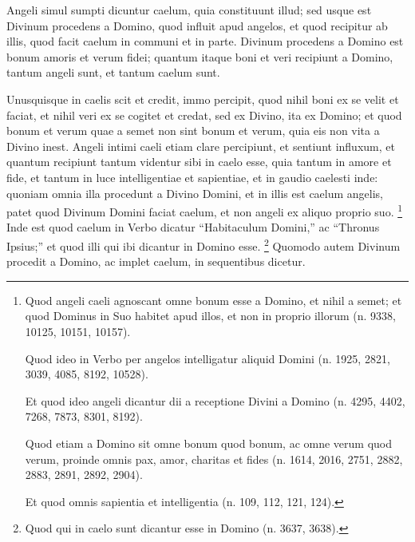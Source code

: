 
\begin{topic}{7}
    Angeli simul sumpti dicuntur caelum, quia constituunt illud; sed usque est Divinum procedens a Domino, quod influit
    apud angelos, et quod recipitur ab illis, quod facit caelum in communi et in parte.
    Divinum procedens a Domino est bonum amoris et verum fidei; quantum itaque boni et veri recipiunt a Domino, tantum
    angeli sunt, et tantum caelum sunt.
\end{topic}

\begin{topic}{8}
    Unusquisque in caelis scit et credit, immo percipit, quod nihil boni ex se velit et faciat, et nihil veri ex se
    cogitet et credat, sed ex Divino, ita ex Domino; et quod bonum et verum quae a semet non sint bonum et verum, quia
    eis non vita a Divino inest.
    Angeli intimi caeli etiam clare percipiunt, et sentiunt influxum, et quantum recipiunt tantum videntur sibi in caelo
    esse, quia tantum in amore et fide, et tantum in luce intelligentiae et sapientiae, et in gaudio caelesti inde:
    quoniam omnia illa procedunt a Divino Domini, et in illis est caelum angelis, patet quod Divinum Domini faciat
    caelum, et non angeli ex aliquo proprio suo.
    \footnote{
        Quod angeli caeli agnoscant omne bonum esse a Domino, et nihil a semet; et quod Dominus in Suo habitet apud
        illos, et non in proprio illorum (n. 9338, 10125, 10151, 10157).

        Quod ideo in Verbo per angelos intelligatur aliquid Domini (n. 1925, 2821, 3039, 4085, 8192, 10528).

        Et quod ideo angeli dicantur dii a receptione Divini a Domino (n. 4295, 4402, 7268, 7873, 8301, 8192).

        Quod etiam a Domino sit omne bonum quod bonum, ac omne verum quod verum, proinde omnis pax, amor, charitas et
        fides (n. 1614, 2016, 2751, 2882, 2883, 2891, 2892, 2904).

        Et quod omnis sapientia et intelligentia (n. 109, 112, 121, 124).
    }
    Inde est quod caelum in Verbo dicatur ``Habitaculum Domini,'' ac ``Thronus Ipsius;'' et quod illi qui ibi dicantur
    in Domino esse.
    \footnote{
        Quod qui in caelo sunt dicantur esse in Domino (n. 3637, 3638).
    }
    Quomodo autem Divinum procedit a Domino, ac implet caelum, in sequentibus dicetur.
\end{topic}

